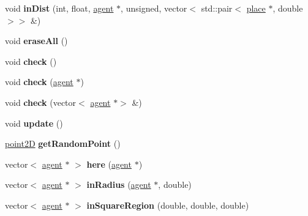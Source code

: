 \begin{DoxyCompactItemize}
\item 
\mbox{\label{classsearchGrid_a0b410acf9c8c7e1fb394538a978558f9}} 
void {\bfseries in\+Dist} (int, float, \mbox{\hyperlink{classagent}{agent}} $\ast$, unsigned, vector$<$ std\+::pair$<$ \mbox{\hyperlink{classplace}{place}} $\ast$, double $>$$>$ \&)
\item 
\mbox{\label{classsearchGrid_a4b265b6f595070c5aa53e8c9be4cdcc3}} 
void {\bfseries erase\+All} ()
\item 
\mbox{\label{classsearchGrid_af88dcb0059b356e4589f07fc7789a829}} 
void {\bfseries check} ()
\item 
\mbox{\label{classsearchGrid_ab1753e98c052effea4ff86976648a34e}} 
void {\bfseries check} (\mbox{\hyperlink{classagent}{agent}} $\ast$)
\item 
\mbox{\label{classsearchGrid_a60d9100d9505f9683d0e81a5a2394bef}} 
void {\bfseries check} (vector$<$ \mbox{\hyperlink{classagent}{agent}} $\ast$$>$ \&)
\item 
\mbox{\label{classsearchGrid_a4318a1602cc5f146f8c181b827578888}} 
void {\bfseries update} ()
\item 
\mbox{\label{classsearchGrid_afec32e1fa615155a897d734c1bf7a27f}} 
\mbox{\hyperlink{classpoint2D}{point2D}} {\bfseries get\+Random\+Point} ()
\item 
\mbox{\label{classsearchGrid_a8695b1f2b62492cbe41083ac8d3758fb}} 
vector$<$ \mbox{\hyperlink{classagent}{agent}} $\ast$ $>$ {\bfseries here} (\mbox{\hyperlink{classagent}{agent}} $\ast$)
\item 
\mbox{\label{classsearchGrid_a99945ae6845a2e1074062e869c69c3e2}} 
vector$<$ \mbox{\hyperlink{classagent}{agent}} $\ast$ $>$ {\bfseries in\+Radius} (\mbox{\hyperlink{classagent}{agent}} $\ast$, double)
\item 
\mbox{\label{classsearchGrid_aad8ab42926dab85d6f4afc5084bc532c}} 
vector$<$ \mbox{\hyperlink{classagent}{agent}} $\ast$ $>$ {\bfseries in\+Square\+Region} (double, double, double)

\end{DoxyCompactItemize}
